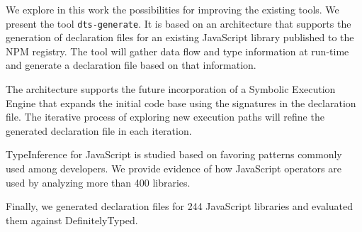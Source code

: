 We explore in this work the possibilities for improving the existing tools. We present the tool \texttt{dts-generate}. It is based on an architecture that supports the generation of declaration files for an existing JavaScript library published to the NPM registry. The tool will gather data flow and type information at run-time and generate a declaration file based on that information.

The architecture supports the future incorporation of a Symbolic Execution Engine that expands the initial code base using the signatures in the declaration file. The iterative process of exploring new execution paths will refine the generated declaration file in each iteration.

TypeInference for JavaScript is studied based on favoring patterns commonly used among developers. We provide evidence of how JavaScript operators are used by analyzing more than 400 libraries.

Finally, we generated declaration files for 244 JavaScript libraries and evaluated them against DefinitelyTyped.

